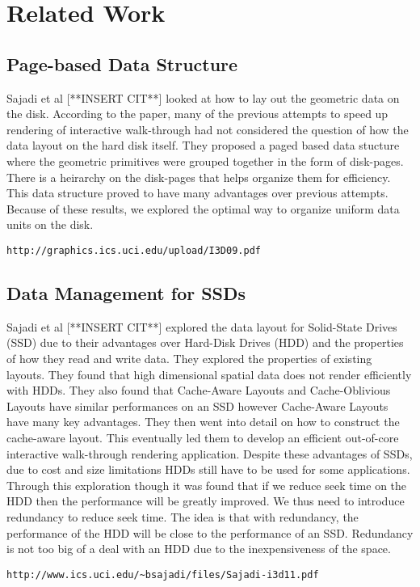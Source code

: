 \documentclass[11pt,psfig]{article}
\begin{document}
\section*{Related Work}

\subsection*{Page-based Data Structure}
Sajadi et al [**INSERT CIT**] looked at how to lay out the geometric data on the disk. According to the paper, many of the previous attempts to speed up rendering of interactive walk-through had not considered the question of how the data layout on the hard disk itself. They proposed a paged based data stucture where the geometric primitives were grouped together in the form of disk-pages. There is a heirarchy on the disk-pages that helps organize them for efficiency. This data structure proved to have many advantages over previous attempts. Because of these results, we explored the optimal way to organize uniform data units on the disk. 
\begin{verbatim}
http://graphics.ics.uci.edu/upload/I3D09.pdf
\end{verbatim}

\subsection*{Data Management for SSDs}
Sajadi et al [**INSERT CIT**] explored the data layout for Solid-State Drives (SSD) due to their advantages over Hard-Disk Drives (HDD) and the properties of how they read and write data. They explored the properties of existing layouts. They found that high dimensional spatial data does not render efficiently with HDDs. They also found that Cache-Aware Layouts and Cache-Oblivious Layouts have similar performances on an SSD however Cache-Aware Layouts have many key advantages. They then went into detail on how to construct the cache-aware layout. This eventually led them to develop an efficient out-of-core interactive walk-through rendering application. Despite these advantages of SSDs, due to cost and size limitations HDDs still have to be used for some applications. Through this exploration though it was found that if we reduce seek time on the HDD then the performance will be greatly improved. We thus need to introduce redundancy to reduce seek time. The idea is that with redundancy, the performance of the HDD will be close to the performance of an SSD. Redundancy is not too big of a deal with an HDD due to the inexpensiveness of the space.
\begin{verbatim}
http://www.ics.uci.edu/~bsajadi/files/Sajadi-i3d11.pdf
\end{verbatim}
\end{document}
